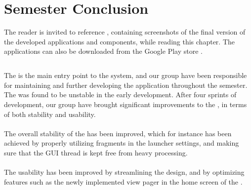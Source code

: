 \chapter{Semester Conclusion}
\label{cha:conclusion_final}

The reader is invited to reference , containing screenshots of the final version of the developed applications and components, while reading this chapter. The applications can also be downloaded from the Google Play store \parencite{giraf_google_play}.

\section*{\launcher}
The \launcher is the main entry point to the \giraf system, and our group have been responsible for maintaining and further developing the application throughout the semester. The \launcher was found to be unstable in the early development. After four sprints of development, our group have brought significant improvements to the \launcher, in terms of both stability and usability.
\\\\
The overall stability of the \launcher has been improved, which for instance has been achieved by properly utilizing fragments in the launcher settings, and making sure that the GUI thread is kept free from heavy processing. 
\\\\
The usability has been improved by streamlining the design, and by optimizing features such as the newly implemented view pager in the home screen of the \launcher.

